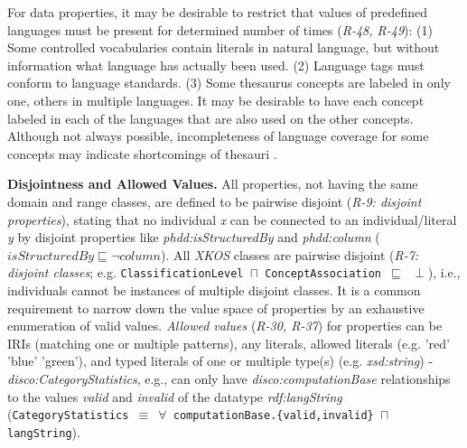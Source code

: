 \documentclass{llncs}
\newcommand{\ms}[1]{\texttt{#1}}
\begin{document}
%
%
%


For data properties, it may be desirable to restrict that values of predefined languages must be present for determined number of times (\emph{R-48, R-49}):
(1) Some controlled vocabularies contain literals in natural language, but without information what language has actually been used. 
(2) Language tags must conform to language standards. 
(3) Some thesaurus concepts are labeled in only one, others in multiple languages. It may be desirable to have each concept labeled in each of the languages that are also used on the other concepts. Although not always possible, incompleteness of language coverage for some concepts may indicate shortcomings of thesauri
\cite{MaderHaslhoferIsaac2012}.

\textbf{Disjointness and Allowed Values.}
All properties, not having the same domain and range classes, are defined to be pairwise disjoint
(\emph{R-9: disjoint properties}), stating that no individual \emph{x} can be connected to an individual/literal \emph{y} by disjoint properties like \emph{phdd:isStructuredBy} and \emph{phdd:column} ($isStructuredBy \sqsubseteq \neg column$).
All \emph{XKOS} classes are pairwise disjoint (\emph{R-7: disjoint classes}; e.g. \ms{ClassificationLevel $\sqcap$ ConceptAssociation $\sqsubseteq$ $\perp$}),
i.e., individuals cannot be instances of multiple disjoint classes.
It is a common requirement to narrow down the value space of properties by an exhaustive enumeration of valid values.  
\emph{Allowed values} (\emph{R-30, R-37}) for properties can be IRIs (matching one or multiple patterns), any literals, allowed literals (e.g. 'red' 'blue' 'green'), and typed literals of one or multiple type(s) (e.g. \emph{xsd:string}) - 
\emph{disco:CategoryStatistics}, e.g., can only have \emph{disco:computationBase} relationships to the values \emph{valid} and \emph{invalid} of the datatype \emph{rdf:langString} (\ms{CategoryStatistics $\equiv$ $\forall$ computationBase.\{valid,invalid\} $\sqcap$ langString}).
\end{document}
